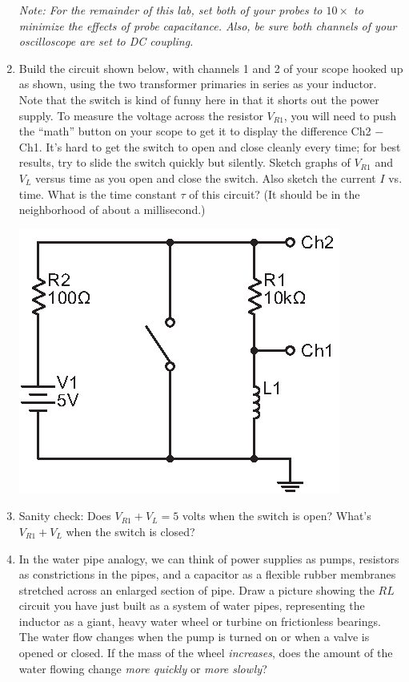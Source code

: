 \begin{enumerate}[wide]
\medskip 

\textit{Note: For the remainder of this lab, set both of your probes to $10\times$ to minimize the effects of probe capacitance. Also, be sure both channels of your oscilloscope are set to DC coupling.}

\item Build the circuit shown below, with channels 1 and 2 of your scope hooked up as shown, using the two transformer primaries in series as your inductor.  Note that the switch is kind of funny here in that it shorts out the power supply.  To measure the voltage across the resistor $V_{R1}$, you will need to push the ``math'' button on your scope to get it to display the difference Ch2 $-$ Ch1.  It's hard to get the switch to open and close cleanly every time; for best results, try to slide the switch quickly but silently.  Sketch graphs of $V_{R1}$ and $V_L$ versus time as you open and close the switch.   Also sketch the current $I$ vs. time.  What is the time constant $\tau$ of this circuit?  (It should be in the neighborhood of about a millisecond.)  \label{part_rl_constant}
\begin{center}
\includegraphics{inductors/single_dc_inductor.eps}
\end{center}

\item Sanity check: Does $V_{R1} +V_L = 5$ volts when the switch is open?  What's $V_{R1} +V_L$ when the switch is closed?

\item In the water pipe analogy, we can think of power supplies as pumps, resistors as constrictions in the pipes, and a capacitor as a flexible rubber membranes stretched across an enlarged section of pipe.  Draw a picture showing the $RL$ circuit you have just built as a system of water pipes, representing the inductor as a giant, heavy water wheel or turbine on frictionless bearings.  
The water flow changes when the pump is turned on or when a valve is opened or closed.
If the mass of the wheel \textit{increases}, does the amount of the water flowing change \textit{more quickly} or \textit{more slowly}?


\end{enumerate}
